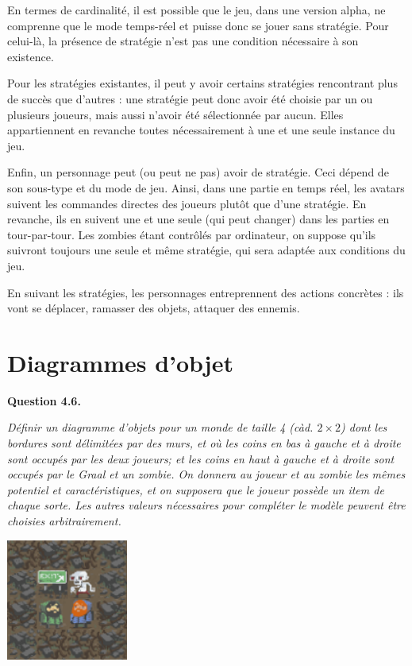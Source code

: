\documentclass[oneside,a4paper]{book}
\begin{document}
En termes de cardinalité, il est possible que le jeu, dans une version alpha, ne comprenne que le mode temps-réel et puisse donc se jouer sans stratégie. Pour celui-là, la présence de stratégie n'est pas une condition nécessaire à son existence. \newline

Pour les stratégies existantes, il peut y avoir certains stratégies rencontrant plus de succès que d'autres : une stratégie peut donc avoir été choisie par un ou plusieurs joueurs, mais aussi n'avoir été sélectionnée par aucun. Elles appartiennent en revanche toutes nécessairement à une et une seule instance du jeu.\newline

Enfin, un personnage peut (ou peut ne pas) avoir de stratégie. Ceci dépend de son sous-type et du mode de jeu. Ainsi, dans une partie en temps réel, les avatars suivent les commandes directes des joueurs plutôt que d'une stratégie. En revanche, ils en suivent une et une seule (qui peut changer) dans les parties en tour-par-tour. Les zombies étant contrôlés par ordinateur, on suppose qu'ils suivront toujours une seule et même stratégie, qui sera adaptée aux conditions du jeu.\newline

En suivant les stratégies, les personnages entreprennent des actions concrètes : ils vont se déplacer, ramasser des objets, attaquer des ennemis.

\chapter{Diagrammes d'objet}

\textbf{Question 4.6.}\label{Question 4.6.}\newline

\textit{Définir un diagramme d'objets pour un monde de taille 4 (càd. $2\times 2$) dont les bordures sont délimitées par des murs, et où les coins en bas à gauche et à droite sont occupés par les deux joueurs; et les coins en haut à gauche et à droite sont occupés par le Graal et un zombie. On donnera au joueur et au zombie les mêmes potentiel et caractéristiques, et on supposera que le joueur possède un item de chaque sorte. Les autres valeurs nécessaires pour compléter le modèle peuvent être choisies arbitrairement.}

\begin{center}
    \includegraphics[width=4cm,keepaspectratio]{Images/board-reduced.png}
\end{center}
\end{document}
